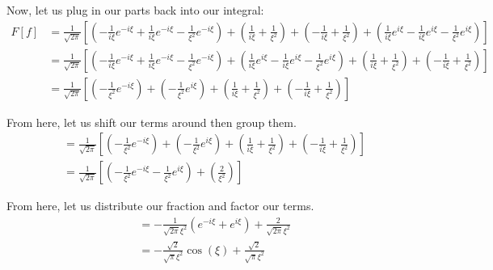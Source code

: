\begin{enumerate}
Now, let us plug in our parts back into our integral:
%
\begin{align}
  F[f]
  & =
  \frac{1}{\sqrt{2 \pi}}
  \left[
    \left(
      - \frac{1}{ i \xi} e^{-i \xi}
      + \frac{1}{ i \xi} e^{-i \xi}
      - \frac{1}{ \xi^2} e^{-i \xi}
    \right)
    +
    \left(
      \frac{1}{ i \xi}
    + \frac{1}{ \xi^2}
    \right)
    +
    \left(
    - \frac{1}{ i \xi}
    + \frac{1}{ \xi^2}
    \right)
    +
    \left(
      \frac{1}{ i \xi} e^{i \xi}
    - \frac{1}{ i \xi} e^{i \xi}
    - \frac{1}{ \xi^2} e^{i \xi}
    \right)
  \right]\\
  & =
  \frac{1}{\sqrt{2 \pi}}
  \left[
  \left(
    - \frac{1}{ i \xi} e^{-i \xi}
    + \frac{1}{ i \xi} e^{-i \xi}
    - \frac{1}{ \xi^2} e^{-i \xi}
  \right)
  +
  \left(
  \frac{1}{ i \xi} e^{i \xi}
  - \frac{1}{ i \xi} e^{i \xi}
  - \frac{1}{ \xi^2} e^{i \xi}
  \right)
  +
  \left(
    \frac{1}{ i \xi}
  + \frac{1}{ \xi^2}
  \right)
  +
  \left(
  - \frac{1}{ i \xi}
  + \frac{1}{ \xi^2}
  \right)
  \right]\\
  & =
  \frac{1}{\sqrt{2 \pi}}
  \left[
  \left(
    - \frac{1}{ \xi^2} e^{-i \xi}
  \right)
  +
  \left(
    - \frac{1}{ \xi^2} e^{i \xi}
  \right)
  +
  \left(
    \frac{1}{ i \xi}
  + \frac{1}{ \xi^2}
  \right)
  +
  \left(
  - \frac{1}{ i \xi}
  + \frac{1}{ \xi^2}
  \right)
  \right]
\end{align}

From here, let us shift our terms around then group them.
%
\begin{align}
  & =
  \frac{1}{\sqrt{2 \pi}}
  \left[
  \left(
    - \frac{1}{ \xi^2} e^{-i \xi}
  \right)
  +
  \left(
    - \frac{1}{ \xi^2} e^{i \xi}
  \right)
  +
  \left(
    \frac{1}{ i \xi}
  + \frac{1}{ \xi^2}
  \right)
  +
  \left(
  - \frac{1}{ i \xi}
  + \frac{1}{ \xi^2}
  \right)
  \right]\\
  & =
  \frac{1}{\sqrt{2 \pi}}
  \left[
  \left(
    - \frac{1}{ \xi^2} e^{-i \xi}
    - \frac{1}{ \xi^2} e^{i \xi}
  \right)
  +
  \left(
   \frac{2}{ \xi^2}
  \right)
  \right]
\end{align}

From here, let us distribute our fraction and factor our terms.
%
\begin{align}
  & =
  -\frac{1}{\sqrt{2 \pi} \xi^2}
  \left(
      e^{-i \xi}
    + e^{i \xi}
  \right)
  +
   \frac{2}{\sqrt{2 \pi} \xi^2}\\
   & =
   -\frac{\sqrt 2}{\sqrt{\pi} \xi^2} \cos(\xi)
   +
    \frac{\sqrt 2}{\sqrt{\pi} \xi^2}
\end{align}
\end{enumerate}
